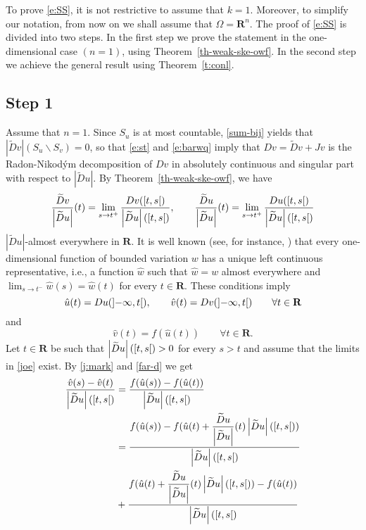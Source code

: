 \documentclass[mlq,fleqn]{w-art}
\newcommand{\thmref}[1]{Theorem~\ref{#1}}
\newcommand{\wt}{\widetilde}
\newcommand{\interval}[1]{\mathinner{#1}}
\newcommand{\envert}[1]{\left\lvert#1\right\rvert}
\let\abs=\envert
\begin{document}
To prove \eqref{e:SS}, it is not restrictive to assume that $k=1$.
Moreover, to simplify our notation, from now on we shall assume that
$\Omega = \mathbf{R}^n$. The proof of \eqref{e:SS} is divided into two
steps. In the first step we prove the statement in the one-dimensional
case $(n=1)$, using \thmref{th-weak-ske-owf}. In the second step we
achieve the general result using \thmref{t:conl}.

\subsection*{Step 1}
Assume that $n=1$. Since $S_u$ is at most countable, \eqref{sum-bij}
yields that $\abs{\wt{D}v}(S_u\backslash S_v)=0$, so that
\eqref{e:st} and \eqref{e:barwq} imply that $Dv=\wt{D}v+Jv$ is
the Radon-Nikod\'ym decomposition of $Dv$ in absolutely continuous and
singular part with respect to $\abs{\wt{D} u}$. By
\thmref{th-weak-ske-owf}, we have
\begin{equation*}
\frac{\wt{D}v}{\abs{\wt{D}u}}(t)=\lim_{s\to t^+}
\frac{Dv(\interval{\left[t,s\right[})}
{\abs{\wt{D}u}(\interval{\left[t,s\right[})},\qquad
\frac{\wt{D}u}{\abs{\wt{D}u}}(t)=\lim_{s\to t^+}
\frac{Du(\interval{\left[t,s\right[})}
{\abs{\wt{D}u}(\interval{\left[t,s\right[})}
\end{equation*}
$\abs{\wt{D}u}$-almost everywhere in $\mathbf{R}$. It is well known
(see, for instance, \cite[2.5.16]{ste:sint}) that every one-dimensional
function of bounded variation $w$ has a unique left continuous
representative, i.e., a function $\hat w$ such that $\hat w=w$ almost
everywhere and $\lim_{s\to t^-}\hat w(s)=\hat w(t)$ for every $t\in
\mathbf{R}$. These conditions imply
\begin{equation}
\hat u(t)=Du(\interval{\left]-\infty,t\right[}),
\qquad \hat v(t)=Dv(\interval{\left]-\infty,t\right[})\qquad
\forall t\in\mathbf{R}
\end{equation}
and
\begin{equation}\label{alimo}
\hat v(t)=f(\hat u(t))\qquad\forall t\in\mathbf{R}.\end{equation}
Let $t\in\mathbf{R}$ be such that
$\abs{\wt{D}u}(\interval{\left[t,s\right[})>0$ for every $s>t$ and
assume that the limits in \eqref{joe} exist. By \eqref{j:mark} and
\eqref{far-d} we get
\begin{equation*}\begin{split}
\frac{\hat v(s)-\hat
v(t)}{\abs{\wt{D}u}(\interval{\left[t,s\right[})}&=\frac {f(\hat
u(s))-f(\hat u(t))}{\abs{\wt{D}u}(\interval{\left[t,s\right[})}\\
&=\frac{f(\hat u(s))-f(\hat
u(t)+\dfrac{\wt{D}u}{\abs{\wt{D}u}}(t)\abs{\wt{D}u
}(\interval{\left[t,s\right[}))}%
{\abs{\wt{D}u}(\interval{\left[t,s\right[})}\\
&+\frac
{f(\hat u(t)+\dfrac{\wt{D}u}{\abs{\wt{D}u}}(t)\abs{\wt{D}
u}(\interval{\left[t,s\right[}))-f(\hat
u(t))}{\abs{\wt{D}u}(\interval{\left[t,s\right[})}
\end{split}\end{equation*}
\end{document}
